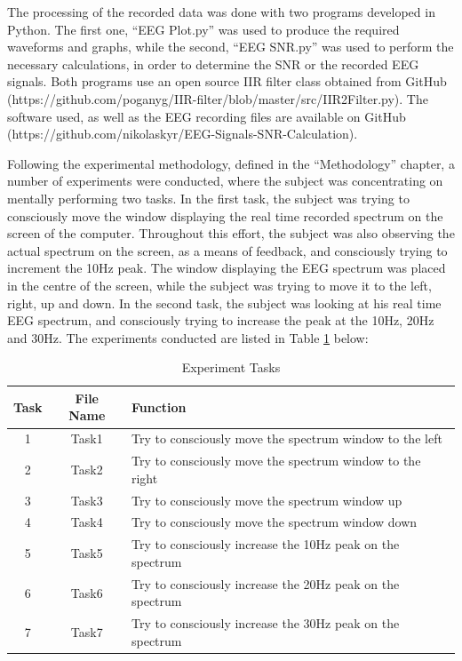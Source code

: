The processing of the recorded data was done with two programs developed in Python. The first one, “EEG Plot.py” was used to produce the required waveforms and graphs, while the second, “EEG SNR.py” was used to perform the necessary calculations, in order to determine the SNR or the recorded EEG signals. Both programs use an open source IIR filter class obtained from GitHub (https://github.com/poganyg/IIR-filter/blob/master/src/IIR2Filter.py). The software used, as well as the EEG recording files are available on GitHub (https://github.com/nikolaskyr/EEG-Signals-SNR-Calculation).
 
Following the experimental methodology, defined in the “Methodology” chapter, a number of experiments were conducted, where the subject was concentrating on mentally performing two tasks. In the first task, the subject was trying to consciously move the window displaying the real time recorded spectrum on the screen of the computer. Throughout this effort, the subject was also observing the actual spectrum on the screen, as a means of feedback, and consciously trying to increment the 10Hz peak. The window displaying the EEG spectrum was placed in the centre of the screen, while the subject was trying to move it to the left, right, up and down. In the second task, the subject was looking at his real time EEG spectrum, and consciously trying to increase the peak at the 10Hz, 20Hz and 30Hz. The experiments conducted are listed in Table \ref{tasks} below:

\begin{table}[hbt!]
	\caption{Experiment Tasks}
	\label{tasks}
	\centering
	\begin{tabular}{|c|c|l|}
	\hline
		Task & File Name & Function \\
		 \hline\hline
		1 & Task1 & Try to consciously move the spectrum window to the left \\
		2 & Task2 & Try to consciously move the spectrum window to the right \\
		3 & Task3 & Try to consciously move the spectrum window up  \\
		4 & Task4 & Try to consciously move the spectrum window down \\
		5 & Task5 & Try to consciously increase the 10Hz peak on the spectrum \\
		6 & Task6 & Try to consciously increase the 20Hz peak on the spectrum \\
		7 & Task7 & Try to consciously increase the 30Hz peak on the spectrum \\
		 \hline
	\end{tabular}
\end{table}

